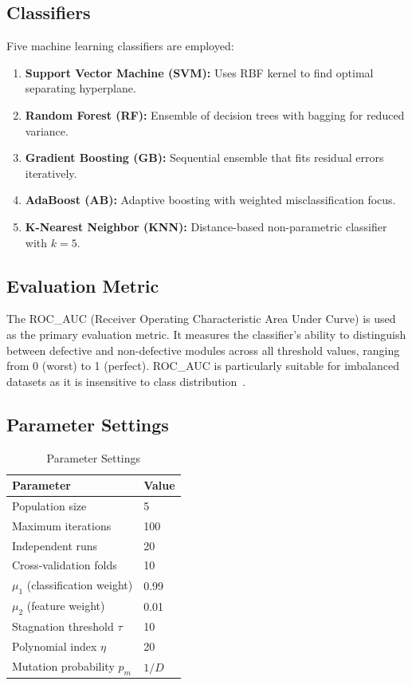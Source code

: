 \documentclass[conference,twocolumn]{IEEEtran}
\begin{document}
\subsection{Classifiers}

Five machine learning classifiers are employed:
\begin{enumerate}
    \item \textbf{Support Vector Machine (SVM):} Uses RBF kernel to find optimal separating hyperplane.
    \item \textbf{Random Forest (RF):} Ensemble of decision trees with bagging for reduced variance.
    \item \textbf{Gradient Boosting (GB):} Sequential ensemble that fits residual errors iteratively.
    \item \textbf{AdaBoost (AB):} Adaptive boosting with weighted misclassification focus.
    \item \textbf{K-Nearest Neighbor (KNN):} Distance-based non-parametric classifier with $k=5$.
\end{enumerate}

\subsection{Evaluation Metric}

The ROC\_AUC (Receiver Operating Characteristic Area Under Curve) is used as the primary evaluation metric. It measures the classifier's ability to distinguish between defective and non-defective modules across all threshold values, ranging from 0 (worst) to 1 (perfect). ROC\_AUC is particularly suitable for imbalanced datasets as it is insensitive to class distribution~\cite{kumar2024two}.

\subsection{Parameter Settings}

\begin{table}[h]
\centering
\caption{Parameter Settings}
\label{tab:params}
\begin{tabular}{ll}
\toprule
\textbf{Parameter} & \textbf{Value} \\
\midrule
Population size & 5 \\
Maximum iterations & 100 \\
Independent runs & 20 \\
Cross-validation folds & 10 \\
$\mu_1$ (classification weight) & 0.99 \\
$\mu_2$ (feature weight) & 0.01 \\
Stagnation threshold $\tau$ & 10 \\
Polynomial index $\eta$ & 20 \\
Mutation probability $p_m$ & $1/D$ \\
\bottomrule
\end{tabular}
\end{table}
\end{document}
